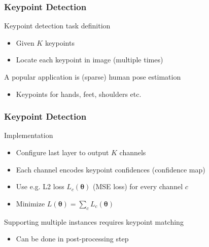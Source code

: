 \documentclass[xetex,professionalfont]{beamer}
\renewcommand\emph[1]{\textcolor{tuwcvl_cvl_blue}{#1}}
\newcommand{\bth}{\boldsymbol{\theta}}
\begin{document}
\begin{frame}
	\frametitle{Keypoint Detection}

	\emph{Keypoint detection} task definition
	\begin{itemize}
		\item Given $K$ \emph{keypoints}
		\item Locate each keypoint in image (multiple times)
	\end{itemize}

	\bigskip
	A popular application is (sparse) \emph{human pose estimation}
	\begin{itemize}
		\item Keypoints for hands, feet, shoulders etc.
	\end{itemize}

\end{frame}


\begin{frame}
	\frametitle{Keypoint Detection}

	Implementation
	\begin{itemize}
		\item Configure last layer to output $K$ channels
		\item Each channel encodes keypoint confidences (\emph{confidence map})
		\item Use e.g. L2 loss $L_c(\bth)$ (\emph{MSE loss}) for every channel $c$ %
		\item Minimize $L(\bth)=\sum_cL_c(\bth)$ %
	\end{itemize}

	\bigskip
	Supporting multiple instances requires keypoint matching
	\begin{itemize}
		\item Can be done in post-processing step
	\end{itemize}

\end{frame}
\end{document}
